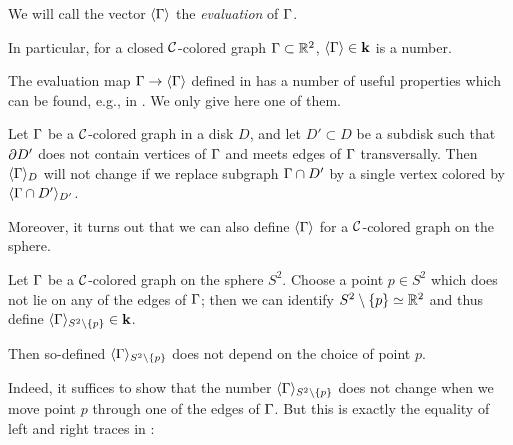 \begin{theorem}
%
%
We will call the vector $\langle\Gamma\rangle$ the {\em evaluation} of $\Gamma$.
\end{theorem}

In particular, for a closed $\mathcal{C}$-colored graph $\Gamma\subset \mathbb{R}^2$,
$\langle\Gamma\rangle\in \mathbf{k}$ is a number.

The evaluation map $\Gamma\to\langle\Gamma\rangle$ defined in  has a
number of useful properties which can be found, e.g., in
. We only give here one of them.

\begin{lemma}\label{l:eval-subdisk}
  Let $\Gamma$ be a $\mathcal{C}$-colored graph in a disk $D$, and let $D'\subset D$ be
  a subdisk such that $\partial D'$ does not contain vertices of $\Gamma$ and meets
  edges of $\Gamma$ transversally. Then $\langle\Gamma\rangle_D$ will not change if we replace
  subgraph $\Gamma\cap D'$ by a single vertex colored by $\langle\Gamma\cap D'\rangle_{D'}$.
\end{lemma}

Moreover, it turns out that we can also define $\langle\Gamma\rangle$ for a $\mathcal{C}$-colored
graph on the sphere.

\begin{lemma}\label{l:colored-spherical}
  Let $\Gamma$ be a $\mathcal{C}$-colored graph on the sphere $S^2$. Choose a point $p\in
  S^2$ which does not lie on any of the edges of $\Gamma$; then we can
  identify $S^2\setminus\{p\}\simeq \mathbb{R}^2$ and thus define
  $\langle\Gamma\rangle_{S^2\setminus\{p\}}\in \mathbf{k}$.

  Then so-defined $\langle\Gamma\rangle_{S^2\setminus\{p\}}$ does not depend on the choice
  of point
  $p$.
\end{lemma}
Indeed, it suffices to show that the number $\langle\Gamma\rangle_{S^2\setminus\{p\}}$ does
not
change when we move point $p$ through one of the edges of $\Gamma$. But this is
exactly the equality of left and right traces in :

